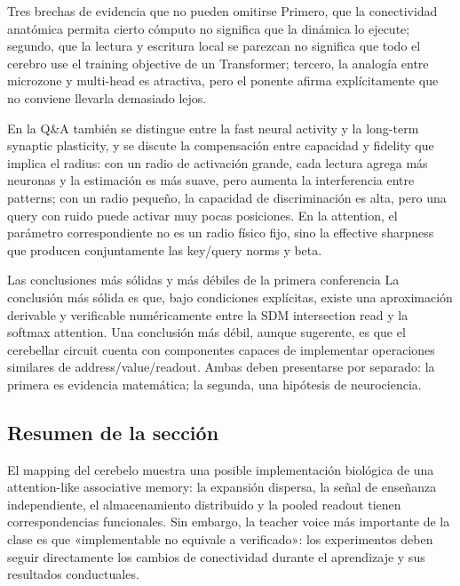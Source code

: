\begin{warningbox}{Tres brechas de evidencia que no pueden omitirse}
Primero, que la conectividad anatómica permita cierto cómputo no significa que la dinámica lo ejecute; segundo, que la lectura y escritura local se parezcan no significa que todo el cerebro use el training objective de un Transformer; tercero, la analogía entre microzone y multi-head es atractiva, pero el ponente afirma explícitamente que no conviene llevarla demasiado lejos.
\end{warningbox}

En la Q\&A también se distingue entre la fast neural activity y la long-term synaptic plasticity, y se discute la compensación entre capacidad y fidelity que implica el radius: con un radio de activación grande, cada lectura agrega más neuronas y la estimación es más suave, pero aumenta la interferencia entre patterns; con un radio pequeño, la capacidad de discriminación es alta, pero una query con ruido puede activar muy pocas posiciones. En la attention, el parámetro correspondiente no es un radio físico fijo, sino la effective sharpness que producen conjuntamente las key/query norms y beta.


\begin{importantbox}{Las conclusiones más sólidas y más débiles de la primera conferencia}
La conclusión más sólida es que, bajo condiciones explícitas, existe una aproximación derivable y verificable numéricamente entre la SDM intersection read y la softmax attention. Una conclusión más débil, aunque sugerente, es que el cerebellar circuit cuenta con componentes capaces de implementar operaciones similares de address/value/readout. Ambas deben presentarse por separado: la primera es evidencia matemática; la segunda, una hipótesis de neurociencia.
\end{importantbox}

\subsection{Resumen de la sección}

El mapping del cerebelo muestra una posible implementación biológica de una attention-like associative memory: la expansión dispersa, la señal de enseñanza independiente, el almacenamiento distribuido y la pooled readout tienen correspondencias funcionales. Sin embargo, la teacher voice más importante de la clase es que «implementable no equivale a verificado»: los experimentos deben seguir directamente los cambios de conectividad durante el aprendizaje y sus resultados conductuales.
